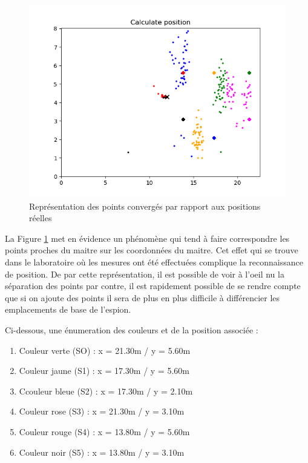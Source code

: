 \begin{figure}[htp]
	\begin{center}
		\includegraphics[scale=0.8]{figures/plot_pos_conv.PNG}
		\caption{Représentation des points convergés par rapport aux positions réelles}
		\label{fig:plotPosConv} %
	\end{center}
\end{figure}

La Figure \ref{fig:plotPosConv} met en évidence un phénomène qui tend à faire correspondre les points proches du maitre sur les coordonnées du maitre. Cet effet qui se trouve dans le laboratoire où les mesures ont été effectuées complique la reconnaissance de position. De par cette représentation, il est possible de voir à l'oeil nu la séparation des points par contre, il est rapidement possible de se rendre compte que si on ajoute des points il sera de plus en plus difficile à différencier les emplacements de base de l'espion.

Ci-dessous, une énumeration des couleurs et de la position associée : 
\begin{enumerate}
	\item Couleur verte (SO) : x = 21.30m / y = 5.60m
	\item Couleur jaune (S1)  : x = 17.30m / y = 5.60m
	\item Ccouleur bleue (S2) : x = 17.30m / y = 2.10m
	\item Couleur rose (S3) : x = 21.30m / y = 3.10m
	\item Couleur rouge (S4) : x = 13.80m / y = 5.60m 
	\item Couleur noir (S5) : x = 13.80m / y = 3.10m 
\end{enumerate} 

